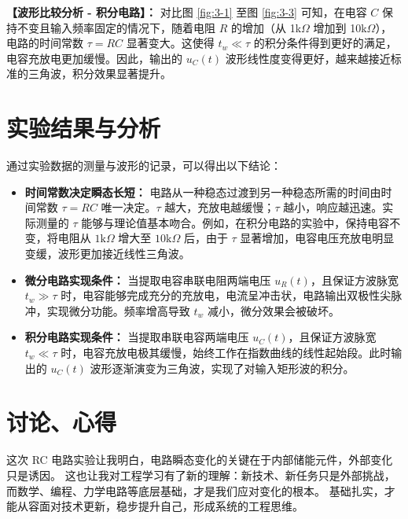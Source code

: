 ﻿\documentclass[10.5pt]{config}
\begin{document}
\vspace{1em}
\noindent \textbf{【波形比较分析 - 积分电路】：} 
对比图 \ref{fig:3-1} 至图 \ref{fig:3-3} 可知，在电容 $C$ 保持不变且输入频率固定的情况下，随着电阻 $R$ 的增加（从 1k$\Omega$ 增加到 10k$\Omega$），电路的时间常数 $\tau = RC$ 显著变大。这使得 $t_w \ll \tau$ 的积分条件得到更好的满足，电容充放电更加缓慢。因此，输出的 $u_C(t)$ 波形线性度变得更好，越来越接近标准的三角波，积分效果显著提升。


\section{实验结果与分析}

通过实验数据的测量与波形的记录，可以得出以下结论：
\begin{itemize}[leftmargin=2em]
    \item \textbf{时间常数决定瞬态长短：} 电路从一种稳态过渡到另一种稳态所需的时间由时间常数 $\tau = RC$ 唯一决定。$\tau$ 越大，充放电越缓慢；$\tau$ 越小，响应越迅速。实际测量的 $\tau$ 能够与理论值基本吻合。例如，在积分电路的实验中，保持电容不变，将电阻从 $1\mathrm{k}\Omega$ 增大至 $10\mathrm{k}\Omega$ 后，由于 $\tau$ 显著增加，电容电压充放电明显变缓，波形更加接近线性三角波。
    \item \textbf{微分电路实现条件：} 当提取电容串联电阻两端电压 $u_R(t)$，且保证方波脉宽 $t_w \gg \tau$ 时，电容能够完成充分的充放电，电流呈冲击状，电路输出双极性尖脉冲，实现微分功能。频率增高导致 $t_w$ 减小，微分效果会被破坏。
    \item \textbf{积分电路实现条件：} 当提取串联电容两端电压 $u_C(t)$，且保证方波脉宽 $t_w \ll \tau$ 时，电容充放电极其缓慢，始终工作在指数曲线的线性起始段。此时输出的 $u_C(t)$ 波形逐渐演变为三角波，实现了对输入矩形波的积分。
\end{itemize}


\section{讨论、心得}
这次 RC 电路实验让我明白，电路瞬态变化的关键在于内部储能元件，外部变化只是诱因。
这也让我对工程学习有了新的理解：新技术、新任务只是外部挑战，而数学、编程、力学电路等底层基础，才是我们应对变化的根本。
基础扎实，才能从容面对技术更新，稳步提升自己，形成系统的工程思维。
\end{document}

